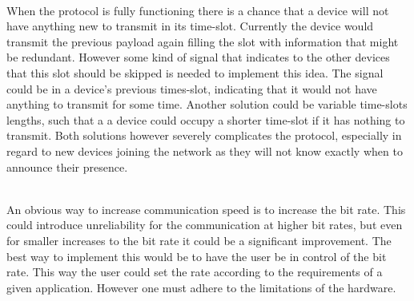 \begin{description}[labelindent=\parindent]
    \item [Skip unnecessary transmissions]\hfill\\
When the protocol is fully functioning there is a chance that a device will not have anything new to transmit in its time-slot.
Currently the device would transmit the previous payload again filling the slot with information that might be redundant.
However some kind of signal that indicates to the other devices that this slot should be skipped is needed to implement this idea.
The signal could be in a device's previous times-slot, indicating that it would not have anything to transmit for some time. 
Another solution could be variable time-slots lengths, such that a a device could occupy a shorter time-slot if it has nothing to transmit. 
Both solutions however severely complicates the protocol, especially in regard to new devices joining the network as they will not know exactly when to announce their presence.

    \item[Increase the bit rate]\hfill\\ 
An obvious way to increase communication speed is to increase the bit rate.
This could introduce unreliability for the communication at higher bit rates, but even for smaller increases to the bit rate it could be a significant improvement.
The best way to implement this would be to have the user be in control of the bit rate.
This way the user could set the rate according to the requirements of a given application.
However one must adhere to the limitations of the hardware.
\end{description}

